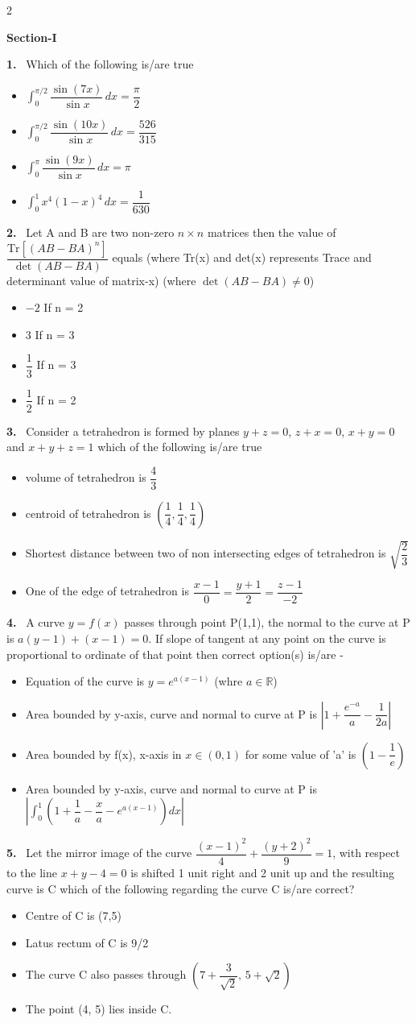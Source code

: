 \documentclass[10pt]{extarticle}
\newcommand{\partsec}[2]{\par\medskip\noindent{\large\bfseries PART-#1: #2}\par\smallskip}
\newcommand{\sect}[1]{\par\smallskip\noindent\textbf{#1}\par}
\newcommand{\qn}[1]{\par\smallskip\noindent\textbf{#1.}~}
\newenvironment{qoptions}{\begin{itemize}[leftmargin=1.8em,itemsep=1pt,topsep=2pt,label={}]}{\end{itemize}}
\newcommand{\opt}[2]{\item[(#1)] #2}
\begin{document}
\begin{multicols}{2}
\partsec{3}{MATHEMATICS}
\sect{Section-I}

\qn{1} Which of the following is/are true
\begin{qoptions}
\opt{A}{$\displaystyle\int_0^{\pi/2}\dfrac{\sin(7x)}{\sin x}\,dx = \dfrac{\pi}{2}$}
\opt{B}{$\displaystyle\int_0^{\pi/2}\dfrac{\sin(10x)}{\sin x}\,dx = \dfrac{526}{315}$}
\opt{C}{$\displaystyle\int_0^{\pi}\dfrac{\sin(9x)}{\sin x}\,dx = \pi$}
\opt{D}{$\displaystyle\int_0^{1} x^4(1-x)^4\,dx = \dfrac{1}{630}$}
\end{qoptions}

\qn{2} Let A and B are two non-zero $n\times n$ matrices then the value of $\dfrac{\mathrm{Tr}\left[(AB-BA)^n\right]}{\det(AB-BA)}$ equals (where Tr(x) and det(x) represents Trace and determinant value of matrix-x) (where $\det(AB-BA)\neq0$)
\begin{qoptions}
\opt{A}{$-2$ If n = 2}
\opt{B}{3 If n = 3}
\opt{C}{$\dfrac{1}{3}$ If n = 3}
\opt{D}{$\dfrac{1}{2}$ If n = 2}
\end{qoptions}

\qn{3} Consider a tetrahedron is formed by planes $y+z=0$, $z+x=0$, $x+y=0$ and $x+y+z=1$ which of the following is/are true
\begin{qoptions}
\opt{A}{volume of tetrahedron is $\dfrac{4}{3}$}
\opt{B}{centroid of tetrahedron is $\left(\dfrac{1}{4},\dfrac{1}{4},\dfrac{1}{4}\right)$}
\opt{C}{Shortest distance between two of non intersecting edges of tetrahedron is $\sqrt{\dfrac{2}{3}}$}
\opt{D}{One of the edge of tetrahedron is $\dfrac{x-1}{0}=\dfrac{y+1}{2}=\dfrac{z-1}{-2}$}
\end{qoptions}

\qn{4} A curve $y=f(x)$ passes through point P(1,1), the normal to the curve at P is $a(y-1)+(x-1)=0$. If slope of tangent at any point on the curve is proportional to ordinate of that point then correct option(s) is/are -
\begin{qoptions}
\opt{A}{Equation of the curve is $y=e^{a(x-1)}$ (whre $a\in\mathbb{R}$)}
\opt{B}{Area bounded by y-axis, curve and normal to curve at P is $\left|1+\dfrac{e^{-a}}{a}-\dfrac{1}{2a}\right|$}
\opt{C}{Area bounded by f(x), x-axis in $x\in(0,1)$ for some value of 'a' is $\left(1-\dfrac{1}{e}\right)$}
\opt{D}{Area bounded by y-axis, curve and normal to curve at P is $\left|\displaystyle\int_0^1\left(1+\dfrac{1}{a}-\dfrac{x}{a}-e^{a(x-1)}\right)dx\right|$}
\end{qoptions}

\qn{5} Let the mirror image of the curve $\dfrac{(x-1)^2}{4}+\dfrac{(y+2)^2}{9}=1$, with respect to the line $x+y-4=0$ is shifted 1 unit right and 2 unit up and the resulting curve is C which of the following regarding the curve C is/are correct?
\begin{qoptions}
\opt{A}{Centre of C is (7,5)}
\opt{B}{Latus rectum of C is 9/2}
\opt{C}{The curve C also passes through $\left(7+\dfrac{3}{\sqrt2},\,5+\sqrt2\right)$}
\opt{D}{The point (4, 5) lies inside C.}
\end{qoptions}


\end{multicols}
\end{document}

